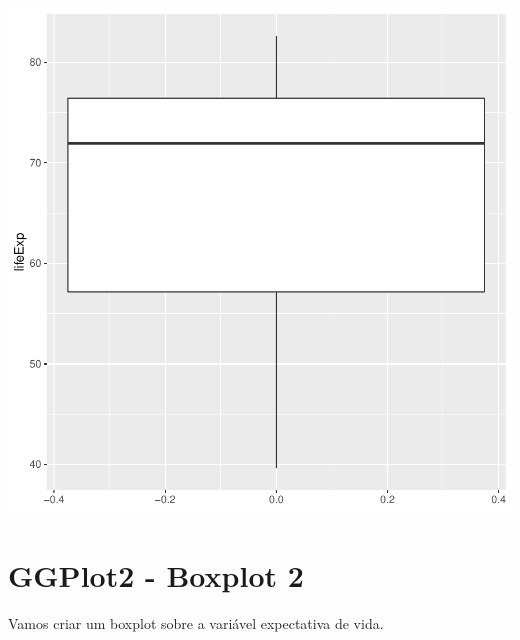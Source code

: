 \documentclass[
]{article}
\newenvironment{Shaded}{\begin{snugshade}}{\end{snugshade}}
\newcommand{\DataTypeTok}[1]{\textcolor[rgb]{0.13,0.29,0.53}{#1}}
\newcommand{\KeywordTok}[1]{\textcolor[rgb]{0.13,0.29,0.53}{\textbf{#1}}}
\newcommand{\NormalTok}[1]{#1}
\newcommand{\OperatorTok}[1]{\textcolor[rgb]{0.81,0.36,0.00}{\textbf{#1}}}
\newcommand{\StringTok}[1]{\textcolor[rgb]{0.31,0.60,0.02}{#1}}
\begin{document}
\begin{center}\includegraphics{arquivo_pdf_files/figure-latex/boxplot1-1} \end{center}

\hypertarget{ggplot2---boxplot-2}{%
\section{GGPlot2 - Boxplot 2}\label{ggplot2---boxplot-2}}

Vamos criar um boxplot sobre a variável expectativa de vida.

\begin{Shaded}
\end{Shaded}
\end{document}
